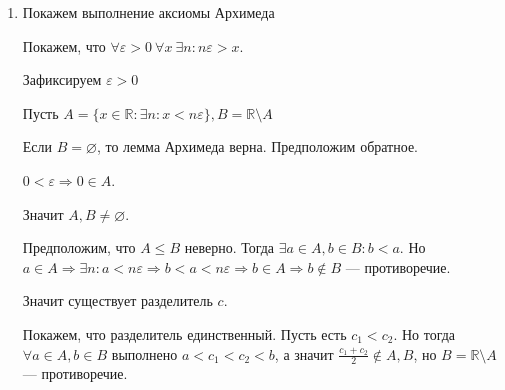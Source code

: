 \documentclass[14pt]{extarticle}
\numberwithin{equation}{section}
\newcommand{\NN}{\mathbb{N}}
\newcommand{\RR}{\mathbb{R}}
\begin{document}
\begin{itemize}
\begin{enumerate}
                    (неравенства выше верны в силу вложенности отрезков)

                    Таким образом для любой последовательности вложенных отрезков у этих отрезков существует общая точка.

                    Если длины стремятся к \( 0 \), то такая точка одна, иначе:
                    \begin{gather*}
                        \forall n \in \NN \ a_n \leq c_1 < c_2 \leq b_n
                        \\
                        \Downarrow
                        \\
                        \forall n \in \NN \ | I_n | > c_2 - c_1
                    \end{gather*}

                    Противоречие с тем, что последовательность стягивающаяся.
                \item
                    Покажем выполнение аксиомы Архимеда

                    Покажем, что  \( \forall \varepsilon > 0 \ \forall x \ \exists n : n \varepsilon > x \).

                    Зафиксируем \( \varepsilon > 0 \)

                    Пусть \( A = \{ x \in \RR : \exists n : x < n \varepsilon \}, B = \RR \setminus A \)

                    Если \( B = \varnothing \), то лемма Архимеда верна. Предположим обратное.

                    \( 0 < \varepsilon \Rightarrow 0 \in A \).

                    Значит \( A, B \neq \varnothing \).

                    Предположим, что \( A \leq B \) неверно.
                    Тогда \( \exists a \in A, b \in B : b < a \).
                    Но
                    \(
                        a \in A \Rightarrow \exists n : a < n \varepsilon
                        \Rightarrow
                        b < a < n \varepsilon \Rightarrow b \in A \Rightarrow b \notin B
                    \) --- противоречие.

                    Значит существует разделитель \( c \).

                    Покажем, что разделитель единственный.
                    Пусть есть \( c_1 < c_2 \).
                    Но тогда \( \forall a \in A, b \in B \) выполнено \( a < c_1 < c_2 < b \),
                    а значит \( \frac{c_1 + c_2}{2} \notin A, B \), но \( B = \RR \setminus A \) --- противоречие.


\end{enumerate}
\end{itemize}
\end{document}
